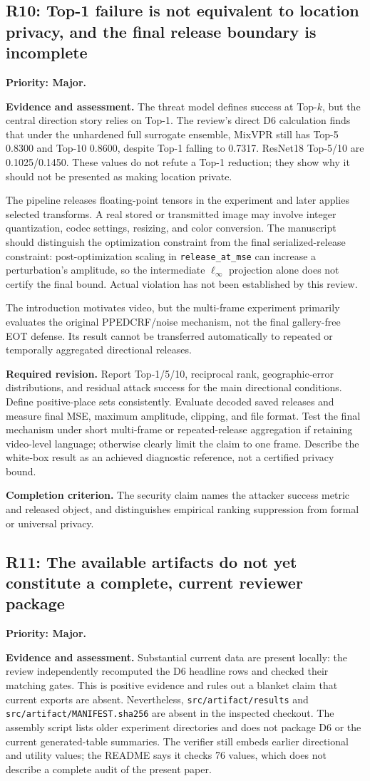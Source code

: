 \documentclass[11pt,a4paper]{article}
\newcommand{\finding}[3]{\subsection{#1: #3}\label{rev:#1}\textbf{Priority: #2.}}
\newcommand{\file}[1]{\nolinkurl{#1}}
\newcommand{\evidence}{\par\textbf{Evidence and assessment.} }
\newcommand{\action}{\par\textbf{Required revision.} }
\newcommand{\acceptance}{\par\textbf{Completion criterion.} }
\begin{document}
\finding{R10}{Major}{Top-1 failure is not equivalent to location privacy, and the final release boundary is incomplete}
\evidence
The threat model defines success at Top-$k$, but the central direction story relies on Top-1. The review's direct D6 calculation finds that under the unhardened full surrogate ensemble, MixVPR still has Top-5 0.8300 and Top-10 0.8600, despite Top-1 falling to 0.7317. ResNet18 Top-5/10 are 0.1025/0.1450. These values do not refute a Top-1 reduction; they show why it should not be presented as making location private.

The pipeline releases floating-point tensors in the experiment and later applies selected transforms. A real stored or transmitted image may involve integer quantization, codec settings, resizing, and color conversion. The manuscript should distinguish the optimization constraint from the final serialized-release constraint: post-optimization scaling in \file{release_at_mse} can increase a perturbation's amplitude, so the intermediate $\ell_\infty$ projection alone does not certify the final bound. Actual violation has not been established by this review.

The introduction motivates video, but the multi-frame experiment primarily evaluates the original PPEDCRF/noise mechanism, not the final gallery-free EOT defense. Its result cannot be transferred automatically to repeated or temporally aggregated directional releases.

\action
Report Top-1/5/10, reciprocal rank, geographic-error distributions, and residual attack success for the main directional conditions. Define positive-place sets consistently. Evaluate decoded saved releases and measure final MSE, maximum amplitude, clipping, and file format. Test the final mechanism under short multi-frame or repeated-release aggregation if retaining video-level language; otherwise clearly limit the claim to one frame. Describe the white-box result as an achieved diagnostic reference, not a certified privacy bound.
\acceptance
The security claim names the attacker success metric and released object, and distinguishes empirical ranking suppression from formal or universal privacy.

\finding{R11}{Major}{The available artifacts do not yet constitute a complete, current reviewer package}
\evidence
Substantial current data are present locally: the review independently recomputed the D6 headline rows and checked their matching gates. This is positive evidence and rules out a blanket claim that current exports are absent. Nevertheless, \file{src/artifact/results} and \file{src/artifact/MANIFEST.sha256} are absent in the inspected checkout. The assembly script lists older experiment directories and does not package D6 or the current generated-table summaries. The verifier still embeds earlier directional and utility values; the README says it checks 76 values, which does not describe a complete audit of the present paper.
\end{document}
